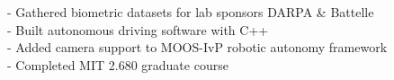 \documentclass[10pt, a4paper]{article}
\newcommand{\years}[1]{\marginnote{\scriptsize #1}}
\begin{document}
- Gathered biometric datasets for lab sponsors DARPA \& Battelle\\
- Built autonomous driving software with C++\\
- Added camera support to MOOS-IvP robotic autonomy framework\\
- Completed MIT 2.680 graduate course\\
\end{document}
